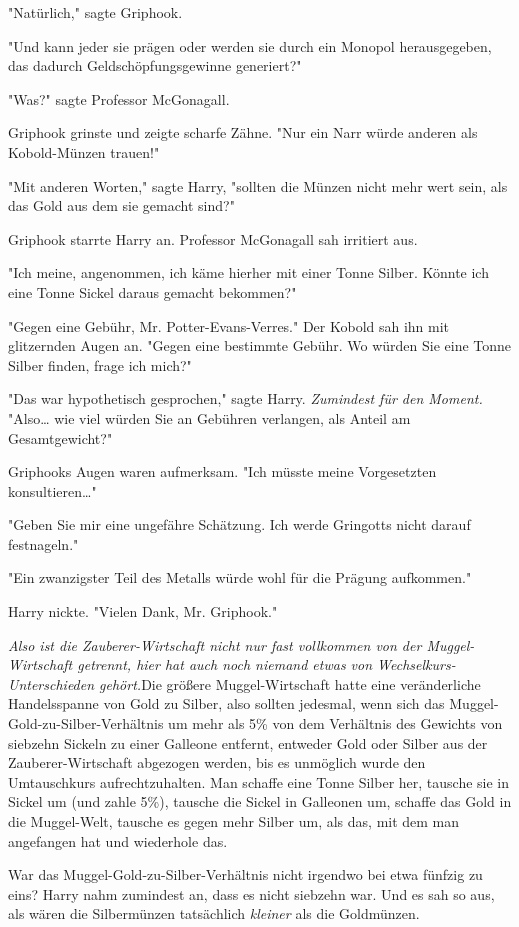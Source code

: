 {"Natürlich," sagte Griphook.

"Und kann jeder sie prägen oder werden sie durch ein Monopol herausgegeben, das dadurch Geldschöpfungsgewinne generiert?"

"Was?" sagte Professor McGonagall.

Griphook grinste und zeigte scharfe Zähne. "Nur ein Narr würde anderen als Kobold-Münzen trauen!"

"Mit anderen Worten," sagte Harry, "sollten die Münzen nicht mehr wert sein, als das Gold aus dem sie gemacht sind?"

Griphook starrte Harry an. Professor McGonagall sah irritiert aus.

"Ich meine, angenommen, ich käme hierher mit einer Tonne Silber. Könnte ich eine Tonne Sickel daraus gemacht bekommen?"

"Gegen eine Gebühr, Mr. Potter-Evans-Verres." Der Kobold sah ihn mit glitzernden Augen an. "Gegen eine bestimmte Gebühr. Wo würden Sie eine Tonne Silber finden, frage ich mich?"

"Das war hypothetisch gesprochen," sagte Harry. \emph{Zumindest für den Moment.} "Also… wie viel würden Sie an Gebühren verlangen, als Anteil am Gesamtgewicht?"

Griphooks Augen waren aufmerksam. "Ich müsste meine Vorgesetzten konsultieren…"

"Geben Sie mir eine ungefähre Schätzung. Ich werde Gringotts nicht darauf festnageln."

"Ein zwanzigster Teil des Metalls würde wohl für die Prägung aufkommen."

Harry nickte. "Vielen Dank, Mr. Griphook."

\emph{Also ist die Zauberer-Wirtschaft nicht nur fast vollkommen von der Muggel-Wirtschaft getrennt, hier hat auch noch niemand etwas von Wechselkurs-Unterschieden gehört.}Die größere Muggel-Wirtschaft hatte eine veränderliche Handelsspanne von Gold zu Silber, also sollten jedesmal, wenn sich das Muggel-Gold-zu-Silber-Verhältnis um mehr als 5\% von dem Verhältnis des Gewichts von siebzehn Sickeln zu einer Galleone entfernt, entweder Gold oder Silber aus der Zauberer-Wirtschaft abgezogen werden, bis es unmöglich wurde den Umtauschkurs aufrechtzuhalten. Man schaffe eine Tonne Silber her, tausche sie in Sickel um (und zahle 5\%), tausche die Sickel in Galleonen um, schaffe das Gold in die Muggel-Welt, tausche es gegen mehr Silber um, als das, mit dem man angefangen hat und wiederhole das.

War das Muggel-Gold-zu-Silber-Verhältnis nicht irgendwo bei etwa fünfzig zu eins? Harry nahm zumindest an, dass es nicht siebzehn war. Und es sah so aus, als wären die Silbermünzen tatsächlich \emph{kleiner} als die Goldmünzen.

}
